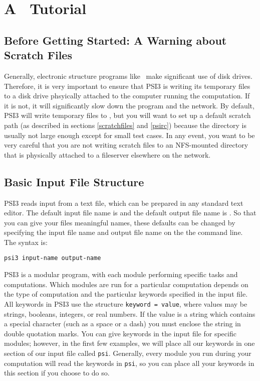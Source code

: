 \section{A \PSIthree\ Tutorial} \label{tutorial}

\subsection{Before Getting Started: A Warning about Scratch Files}
Generally, electronic structure programs like \PSIthree\ make
significant use of disk drives.  Therefore, it is very important
to ensure that PSI3 is writing its temporary files to a disk drive
phsyically attached to the computer running the computation.  If it
is not, it will significantly slow down the program and the network.
By default, PSI3 will write temporary files to , but you
will want to set up a default scratch path (as described in sections
\ref{scratchfiles} and \ref{psirc}) because the  directory
is usually not large enough except for small test cases.  In any 
event, you want to be very careful that you are not writing scratch
files to an NFS-mounted directory that is physically attached to a 
fileserver elsewhere on the network.

\subsection{Basic Input File Structure} 

PSI3 reads input from a text file, which can be prepared in any standard
text editor.  The default input file name is  and the
default output file name is .  So that you can give your
files meaningful names, these defaults can be changed by specifying
the input file name and output file name on the the command line.
The syntax is:

{\tt psi3 input-name output-name}

PSI3 is a modular program, with each module performing specific tasks
and computations.  Which modules are run for a particular computation
depends on the type of computation and the particular keywords specified
in the input file.  All keywords in PSI3 use the structure {\tt keyword =
value}, where values may be strings, booleans, integers, or real numbers.
If the value is a string which contains a special character (such as a
space or a dash) you must enclose the string in double quotation marks.
You can give keywords in the input file for specific modules; however,
in the first few examples, we will place all our keywords in one section
of our input file called {\tt psi}.  Generally, every module you run
during your computation will read the keywords in {\tt psi}, so you
can place all your keywords in this section if you choose to do so.

